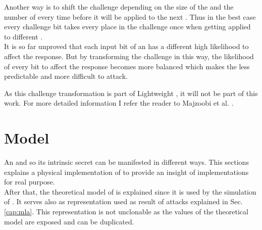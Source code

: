 Another way is to shift the challenge depending on the size of the \puf and the number of \apufs every time before it will be applied to the next \apuf.
Thus in the best case every challenge bit takes every place in the challenge once when getting applied to different \apufs.\\
It is so far unproved that each input bit of an \apuf has a different high likelihood to affect the response.
But by transforming the challenge in this way, the likelihood of every bit to affect the response becomes more balanced which makes the \puf less predictable and more difficult to attack.

As this challenge transformation is part of Lightweight \pufs, it will not be part of this work.
For more detailed information I refer the reader to Majzoobi et al. \cite{Majzoobi2008LightweightPUFs} .


\section{Model}

An \apuf and so its intrinsic secret can be manifested in different ways.
This sections explains a physical implementation of \apufs to provide an insight of \apuf implementations for real purpose.\\
After that, the theoretical model of \apufs is explained since it is used by the simulation of \apufs.
It serves also as representation used as result of attacks explained in Sec. \ref{cap:mla}.
This representation is not unclonable as the values of the theoretical model are exposed and can be duplicated.


